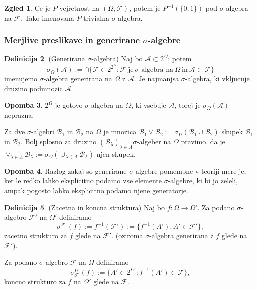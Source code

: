 \documentclass[a4paper,12pt]{article}
\theoremstyle{definition} %
\newtheorem{definicija}{Definicija}[section]
\newtheorem{zgled}[definicija]{Zgled}
\newtheorem{opomba}[definicija]{Opomba}
\theoremstyle{plain} %
\newcommand{\F}{\mathcal{F}}
\newcommand{\A}{\mathcal{A}}
\begin{document}
            \begin{zgled}
                Ce je $P$ vejretnost na $\left( \Omega, \F \right)$, potem je $P^{-1}(\{0, 1\})$ pod-$\sigma$-algebra na $\F$. Tako imenovana $P$-trivialna $\sigma$-algebra.
            \end{zgled}

        \subsubsection{Merjlive preslikave in generirane $\sigma$-algebre}
            
            \begin{definicija}(Generirana $\sigma$-algebra)
                Naj bo $\A \subset 2^\Omega$; potem $$\sigma_\Omega(\A):=\cap\{\F \in 2^{2^\Omega}: \F \ \text{je} \ \sigma\text{-algebra na} \ \Omega \ \text{in} \ \A \subset \F \}$$ imenujemo $\sigma$-algebra generirana na $\Omega$ z $\A$. Je najmanjsa $\sigma$-algebra, ki vkljucuje druzino podmnozic $\A$.
            \end{definicija}

            \begin{opomba}
                $2^\Omega$ je gotovo $\sigma$-algebra na $\Omega$, ki vsebuje $\A$, torej je $\sigma_\Omega(\A)$ neprazna.
            \end{opomba}

            Za dve $\sigma$-algebri $\mathcal{B}_1$ in $\mathcal{B}_2$ na $\Omega$ je mnozica $\mathcal{B}_1 \vee \mathcal{B}_2 := \sigma_\Omega\left(\mathcal{B}_1 \cup \mathcal{B}_2\right)$ skupek $\mathcal{B}_1$ in $\mathcal{B}_2$. Bolj splosno
            za druzino $\left(\mathcal{B}_\lambda\right)_{\lambda \in \Lambda} \sigma$-algeber na $\Omega$ pravimo, da je $\vee_{\lambda \in \Lambda}\mathcal{B}_\lambda := \sigma_\Omega\left(\cup_{\lambda \in \Lambda}\mathcal{B}_\lambda\right)$ njen skupek.

            \begin{opomba}
                Razlog zakaj so generirane $\sigma$-algebre pomembne v teoriji mere je, ker le redko lahko eksplicitno
                podamo vse elemente $\sigma$-algebre, ki bi jo zeleli, ampak pogosto lahko eksplicitno podamo njene generatorje.  
            \end{opomba}

            \begin{definicija}(Zacetna in koncna struktura)
                Naj bo $f:\Omega \rightarrow \Omega'$. Za podano $\sigma$-algebro $\F'$ na $\Omega'$  definiramo $$\sigma^{\F'}(f):= f^{-1}(\F'):=\{f^{-1}(A'):A' \in \F'\},$$
                zacetno strukturo za $f$ glede na $\F'$. (oziroma $\sigma$-algebra generirana z $f$ glede na $\F'$).

                Za podano $\sigma$-algebro $\F$ na $\Omega$ definiramo $$\sigma^{\Omega'}_{\F}(f):=\{A' \in 2^{\Omega'}: f^{-1}(A') \in \F\},$$
                koncno strukturo za $f$ na $\Omega'$ glede na $\F$.
            \end{definicija}
\end{document}
